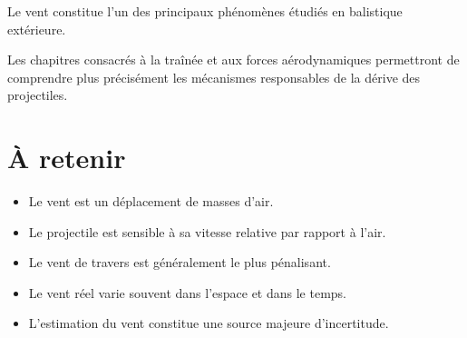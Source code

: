 Le vent constitue l'un des principaux phénomènes étudiés en balistique
extérieure.

Les chapitres consacrés à la traînée et aux forces aérodynamiques
permettront de comprendre plus précisément les mécanismes responsables de la
dérive des projectiles.

\section{À retenir}

\begin{aretenir}

\begin{itemize}
\item Le vent est un déplacement de masses d'air.
\item Le projectile est sensible à sa vitesse relative par rapport à
l'air.
\item Le vent de travers est généralement le plus pénalisant.
\item Le vent réel varie souvent dans l'espace et dans le temps.
\item L'estimation du vent constitue une source majeure d'incertitude.
\end{itemize}

\end{aretenir}

